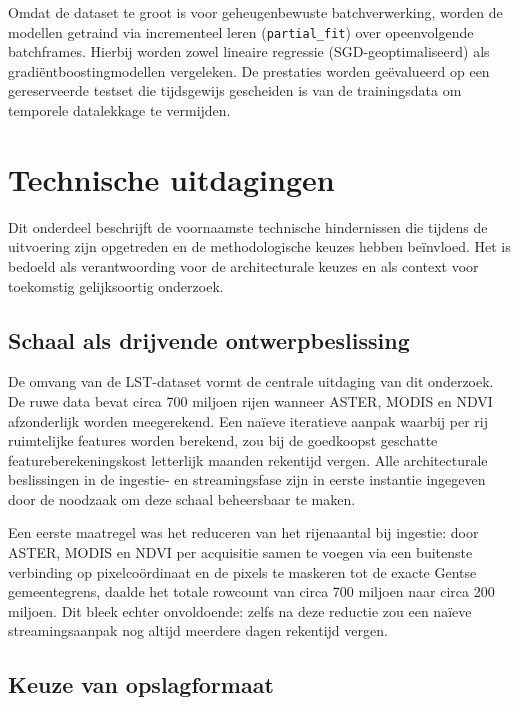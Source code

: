 Omdat de dataset te groot is voor geheugenbewuste batchverwerking, worden de modellen getraind via incrementeel leren (\texttt{partial\_fit}) over opeenvolgende batchframes.
Hierbij worden zowel lineaire regressie (SGD-geoptimaliseerd) als gradiëntboostingmodellen vergeleken.
De prestaties worden geëvalueerd op een gereserveerde testset die tijdsgewijs gescheiden is van de trainingsdata om temporele datalekkage te vermijden.

\section{Technische uitdagingen}
\label{sec:uitdagingen}

Dit onderdeel beschrijft de voornaamste technische hindernissen die tijdens de uitvoering zijn opgetreden en de methodologische keuzes hebben beïnvloed.
Het is bedoeld als verantwoording voor de architecturale keuzes en als context voor toekomstig gelijksoortig onderzoek.

\subsection{Schaal als drijvende ontwerpbeslissing}

De omvang van de LST-dataset vormt de centrale uitdaging van dit onderzoek.
De ruwe data bevat circa 700 miljoen rijen wanneer ASTER, MODIS en NDVI afzonderlijk worden meegerekend.
Een naïeve iteratieve aanpak waarbij per rij ruimtelijke features worden berekend, zou bij de goedkoopst geschatte featureberekeningskost letterlijk maanden rekentijd vergen.
Alle architecturale beslissingen in de ingestie- en streamingsfase zijn in eerste instantie ingegeven door de noodzaak om deze schaal beheersbaar te maken.

Een eerste maatregel was het reduceren van het rijenaantal bij ingestie: door ASTER, MODIS en NDVI per acquisitie samen te voegen via een buitenste verbinding op pixelcoördinaat en de pixels te maskeren tot de exacte Gentse gemeentegrens, daalde het totale rowcount van circa 700 miljoen naar circa 200 miljoen.
Dit bleek echter onvoldoende: zelfs na deze reductie zou een naïeve streamingsaanpak nog altijd meerdere dagen rekentijd vergen.

\subsection{Keuze van opslagformaat}

